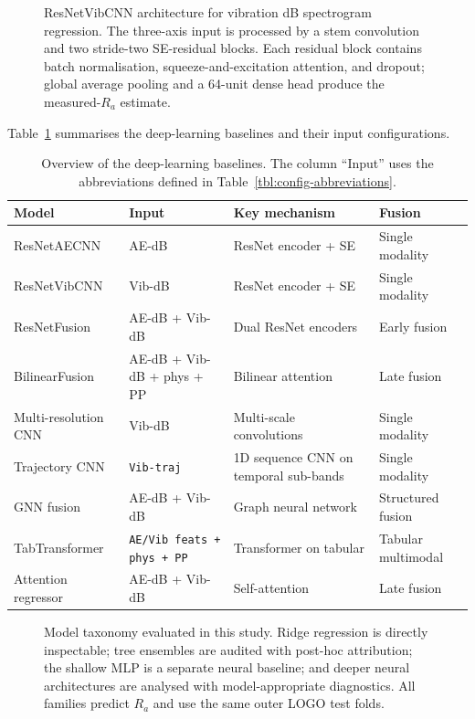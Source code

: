\begin{figure}[htbp]
\centering
\resizebox{\linewidth}{!}{}
\caption{ResNetVibCNN architecture for vibration dB spectrogram
regression. The three-axis input is processed by a stem convolution and
two stride-two SE-residual blocks. Each residual block contains batch
normalisation, squeeze-and-excitation attention, and dropout; global average
pooling and a 64-unit dense head produce the measured-$R_a$ estimate.}
\label{fig:resnetvibcnn-arch}
\end{figure}

Table~\ref{tbl:dl-baselines} summarises the deep-learning baselines and
their input configurations.

\begin{table}[htbp]
\centering
\caption{Overview of the deep-learning baselines. The column ``Input''
uses the abbreviations defined in Table~\ref{tbl:config-abbreviations}.}
\label{tbl:dl-baselines}
\begin{tabular}{@{}llll@{}}
\toprule
Model & Input & Key mechanism & Fusion \\
\midrule
ResNetAECNN & AE-dB & ResNet encoder + SE & Single modality \\
ResNetVibCNN & Vib-dB & ResNet encoder + SE & Single modality \\
ResNetFusion & AE-dB + Vib-dB & Dual ResNet encoders & Early fusion \\
BilinearFusion & AE-dB + Vib-dB + phys + PP & Bilinear attention & Late fusion \\
Multi-resolution CNN & Vib-dB & Multi-scale convolutions & Single modality \\
Trajectory CNN & \texttt{Vib-traj} & 1D sequence CNN on temporal sub-bands & Single modality \\
GNN fusion & AE-dB + Vib-dB & Graph neural network & Structured fusion \\
TabTransformer & \texttt{AE/Vib feats + phys + PP} & Transformer on tabular & Tabular multimodal \\
Attention regressor & AE-dB + Vib-dB & Self-attention & Late fusion \\
\bottomrule
\end{tabular}
\end{table}

\begin{figure}
\centering
\resizebox{\linewidth}{!}{}
\caption{Model taxonomy evaluated in this study. Ridge regression is directly
inspectable; tree ensembles are audited with post-hoc attribution; the shallow
MLP is a separate neural baseline; and deeper neural architectures are analysed
with model-appropriate diagnostics. All families predict $R_a$ and use the same
outer LOGO test folds.}
\label{fig:taxonomy}
\end{figure}

